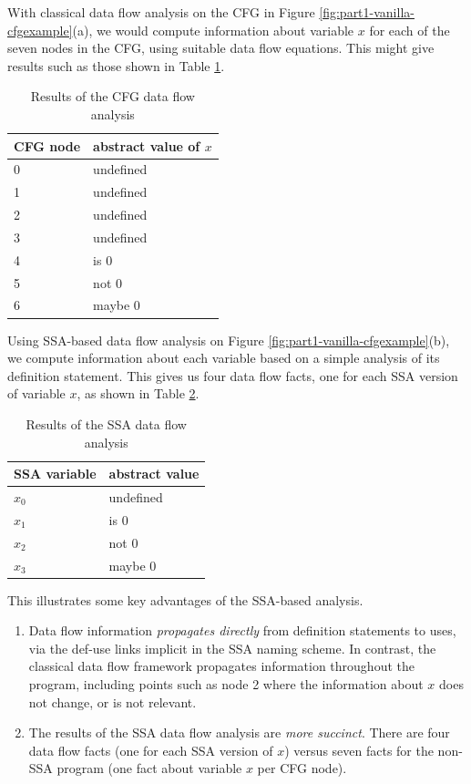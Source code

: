With classical data flow analysis on the CFG in Figure
\ref{fig:part1-vanilla-cfgexample}(a),
we would compute information about variable $x$ for each of the seven nodes
in the CFG, using suitable data flow equations.
This might give results such as those shown in Table
\ref{tab:part1-vanilla-cfgres}.

\begin{table}
\begin{center}
\begin{tabular}{l|l} \hline
CFG node & abstract value of $x$ \\ \hline
0 & undefined \\
1 & undefined \\
2 & undefined \\
3 & undefined \\
4 & is 0 \\
5 & not 0 \\
6 & maybe 0 \\ \hline
\end{tabular}
\end{center}
\caption{\label{tab:part1-vanilla-cfgres}Results of the CFG data flow analysis}
\end{table}

Using SSA-based data flow analysis on Figure 
\ref{fig:part1-vanilla-cfgexample}(b),
we compute information about each variable based on a simple
analysis of its definition statement. This gives us four data flow facts,
one for each SSA version of variable $x$, as shown in Table
\ref{tab:part1-vanilla-ssares}.

\begin{table}
\begin{center}
\begin{tabular}{l|l} \hline
SSA variable & abstract value \\ \hline
$x_0$ & undefined \\
$x_1$ & is 0 \\
$x_2$ & not 0 \\
$x_3$ & maybe 0 \\ \hline
\end{tabular}
\end{center}
\caption{\label{tab:part1-vanilla-ssares}Results of the SSA data flow
  analysis}
\end{table}


This illustrates some key advantages of the SSA-based analysis.
\begin{enumerate}
\item Data flow information
\textit{propagates directly}
from definition statements to uses, via
the def-use links implicit in the SSA naming scheme. 
In contrast, the 
classical data flow framework 
propagates information throughout the program,
including points such as node 2 where the information 
about $x$ does not change, or is not relevant.
\item The results of the SSA data flow analysis are
\textit{more succinct}.
There are four data flow facts (one for each SSA version of $x$)
versus seven facts for the non-SSA program (one fact about variable $x$
per CFG node).
\end{enumerate}


